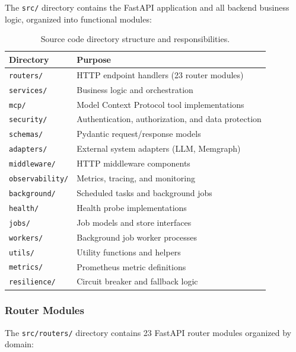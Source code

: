 The \texttt{src/} directory contains the FastAPI application and all backend business logic, organized into functional modules:

\begin{table}[ht]
\centering
\caption{Source code directory structure and responsibilities.}
\label{tab:src-structure}
\small
\begin{tabular}{lp{8cm}}
\hline
\textbf{Directory} & \textbf{Purpose} \\
\hline
\texttt{routers/} & HTTP endpoint handlers (23 router modules) \\
\texttt{services/} & Business logic and orchestration \\
\texttt{mcp/} & Model Context Protocol tool implementations \\
\texttt{security/} & Authentication, authorization, and data protection \\
\texttt{schemas/} & Pydantic request/response models \\
\texttt{adapters/} & External system adapters (LLM, Memgraph) \\
\texttt{middleware/} & HTTP middleware components \\
\texttt{observability/} & Metrics, tracing, and monitoring \\
\texttt{background/} & Scheduled tasks and background jobs \\
\texttt{health/} & Health probe implementations \\
\texttt{jobs/} & Job models and store interfaces \\
\texttt{workers/} & Background job worker processes \\
\texttt{utils/} & Utility functions and helpers \\
\texttt{metrics/} & Prometheus metric definitions \\
\texttt{resilience/} & Circuit breaker and fallback logic \\
\hline
\end{tabular}
\end{table}

\subsubsection{Router Modules}

The \texttt{src/routers/} directory contains 23 FastAPI router modules organized by domain:


